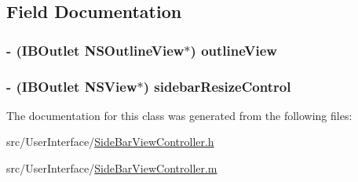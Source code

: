 \subsection{Field Documentation}
\hypertarget{interface_side_bar_view_controller_a2df5f78f79ebb8f68653c3b54304e6e8}{
\subsubsection[{outline\-View}]{\setlength{\rightskip}{0pt plus 5cm}-\/ (I\-B\-Outlet N\-S\-Outline\-View$\ast$) outline\-View\hspace{0.3cm}{\ttfamily [protected]}}}\label{interface_side_bar_view_controller_a2df5f78f79ebb8f68653c3b54304e6e8}
\hypertarget{interface_side_bar_view_controller_ac444dd01ffca31423ba3dff609928afb}{
\subsubsection[{sidebar\-Resize\-Control}]{\setlength{\rightskip}{0pt plus 5cm}-\/ (I\-B\-Outlet N\-S\-View$\ast$) sidebar\-Resize\-Control\hspace{0.3cm}{\ttfamily [protected]}}}\label{interface_side_bar_view_controller_ac444dd01ffca31423ba3dff609928afb}


The documentation for this class was generated from the following files\-:\begin{DoxyCompactItemize}
\item 
src/\-User\-Interface/\hyperlink{_side_bar_view_controller_8h}{Side\-Bar\-View\-Controller.\-h}\item 
src/\-User\-Interface/\hyperlink{_side_bar_view_controller_8m}{Side\-Bar\-View\-Controller.\-m}\end{DoxyCompactItemize}
